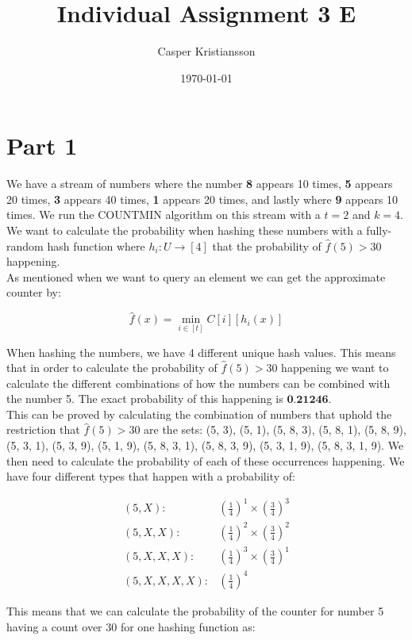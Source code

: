 \documentclass{article}
\title{Individual Assignment 3 E}
\author{Casper Kristiansson}
\date{\today}
\begin{document}
\maketitle

\section{Part 1}
We have a stream of numbers where the number \textbf{8} appears 10 times, \textbf{5} appears 20 times, \textbf{3} appears 40 times, \textbf{1} appears 20 times, and lastly where \textbf{9} appears 10 times. We run the COUNTMIN algorithm on this stream with a \(t=2\) and \(k=4\). We want to calculate the probability when hashing these numbers with a fully-random hash function where \(h_i \colon U \to [4]\) that the probability of \(\hat{f}(5) > 30\) happening. \\

\noindent As mentioned when we want to query an element we can get the approximate counter by:

\[\hat{f}(x) = \min_{i \in [t]} C[i][h_i(x)]\]

\noindent When hashing the numbers, we have 4 different unique hash values. This means that in order to calculate the probability of \(\hat{f}(5) > 30\) happening we want to calculate the different combinations of how the numbers can be combined with the number 5. The exact probability of this happening is \(\textbf{0.21246}\). \\


\noindent This can be proved by calculating the combination of numbers that uphold the restriction that \(\hat{f}(5) > 30\) are the sets: (5, 3), (5, 1), (5, 8, 3), (5, 8, 1), (5, 8, 9), (5, 3, 1), (5, 3, 9), (5, 1, 9), (5, 8, 3, 1), (5, 8, 3, 9), (5, 3, 1, 9), (5, 8, 3, 1, 9). We then need to calculate the probability of each of these occurrences happening. We have four different types that happen with a probability of:


\begin{align*}
(5, X):& \left(\frac{1}{4}\right)^1 \times \left(\frac{3}{4}\right)^3  \\
(5, X, X):& \left(\frac{1}{4}\right)^2 \times \left(\frac{3}{4}\right)^2 \\
(5, X, X, X):& \left(\frac{1}{4}\right)^3 \times \left(\frac{3}{4}\right)^1 \\
(5, X, X, X, X):& \left(\frac{1}{4}\right)^4
\end{align*}

\noindent This means that we can calculate the probability of the counter for number 5 having a count over 30 for one hashing function as:
\end{document}
